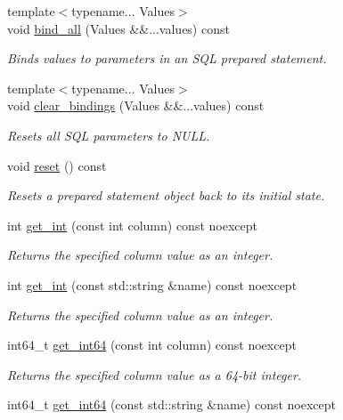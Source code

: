\begin{DoxyCompactItemize}
{\footnotesize template$<$typename... Values$>$ }\\void \hyperlink{a00013_a15ecbabf7d3a6c8b7005e2a799374785}{bind\-\_\-all} (Values \&\&...values) const 
\begin{DoxyCompactList}\small\item\em Binds values to parameters in an S\-Q\-L prepared statement. \end{DoxyCompactList}\item 
{\footnotesize template$<$typename... Values$>$ }\\void \hyperlink{a00013_aaf51f6d9cf5354200151d81959893a77}{clear\-\_\-bindings} (Values \&\&...values) const 
\begin{DoxyCompactList}\small\item\em Resets all S\-Q\-L parameters to N\-U\-L\-L. \end{DoxyCompactList}\item 
void \hyperlink{a00013_a26af62003da471859ccaf29e45606301}{reset} () const 
\begin{DoxyCompactList}\small\item\em Resets a prepared statement object back to its initial state. \end{DoxyCompactList}\item 
int \hyperlink{a00010_a1c720c80fd5c1f0f618c24a3d09e2ef5}{get\-\_\-int} (const int column) const noexcept
\begin{DoxyCompactList}\small\item\em Returns the specified column value as an integer. \end{DoxyCompactList}\item 
int \hyperlink{a00010_a7e1f86fdffd271cb92deb0b21d22fd05}{get\-\_\-int} (const std\-::string \&name) const noexcept
\begin{DoxyCompactList}\small\item\em Returns the specified column value as an integer. \end{DoxyCompactList}\item 
int64\-\_\-t \hyperlink{a00010_afaf16f586744a6bc0ecfb74ab791306c}{get\-\_\-int64} (const int column) const noexcept
\begin{DoxyCompactList}\small\item\em Returns the specified column value as a 64-\/bit integer. \end{DoxyCompactList}\item 
int64\-\_\-t \hyperlink{a00010_a87383f607d2ffc2875eac57ecf8e3989}{get\-\_\-int64} (const std\-::string \&name) const noexcept

\end{DoxyCompactItemize}
